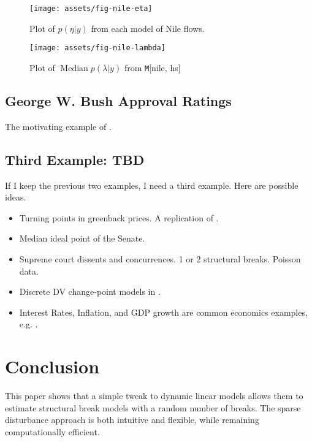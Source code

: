 \documentclass{article}
\DeclareMathOperator{\Median}{Median}
\newcommand{\Model}[2]{\texttt{M}[#1, #2]}
\begin{document}
\begin{figure}[htpb]
  \centering
  \texttt{[image: assets/fig-nile-eta]}
  \caption{Plot of $p(\eta | y)$ from each model of Nile flows.}
  \label{fig:nile-eta}
\end{figure}

\begin{figure}[htpb]
  \centering
  \texttt{[image: assets/fig-nile-lambda]}
  \caption{Plot of $\Median p(\lambda | y)$ from \Model{nile}{hs}}
  \label{fig:nile-lambda}
\end{figure}

\clearpage{}

\subsection{George W. Bush Approval Ratings}
\label{sec:george-w.-bush}

The motivating example of \textcite{RatkovicEng2010}.

\subsection{Third Example: TBD}

If I keep the previous two examples, I need a third example.
Here are possible ideas.

\begin{itemize}
\item Turning points in greenback prices. A replication of \textcite{WillardGuinnaneEtAl1996}.
\item Median ideal point of the Senate. \parencites{RatkovicEng2010}
\item Supreme court dissents and concurrences. 1 or 2 structural breaks. Poisson data. \parencite{CalderiaZorn1998}
\item Discrete DV change-point models in \parencite{Spirling2007b}.
\item Interest Rates, Inflation, and GDP growth are common economics examples, e.g. \textcite{GiordaniKohn2008}.
\end{itemize}

\section{Conclusion}
\label{sec:conclusion}

This paper shows that a simple tweak to dynamic linear models allows them to estimate structural break models with a random number of breaks.
The sparse disturbance approach is both intuitive and flexible, while remaining computationally efficient.
\end{document}
